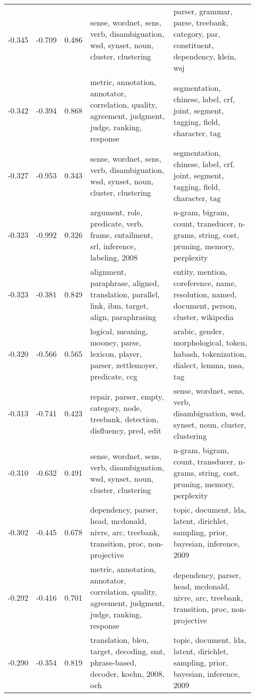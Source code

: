 \begin{tabular}{cccp{5cm}p{5cm}}
-0.345 & -0.709 & 0.486 & sense, wordnet, sens, verb, disambiguation, wsd, synset, noun, cluster, clustering & parser, grammar, parse, treebank, category, par, constituent, dependency, klein, wsj \\
-0.342 & -0.394 & 0.868 & metric, annotation, annotator, correlation, quality, agreement, judgment, judge, ranking, response & segmentation, chinese, label, crf, joint, segment, tagging, field, character, tag \\
-0.327 & -0.953 & 0.343 & sense, wordnet, sens, verb, disambiguation, wsd, synset, noun, cluster, clustering & segmentation, chinese, label, crf, joint, segment, tagging, field, character, tag \\
-0.323 & -0.992 & 0.326 & argument, role, predicate, verb, frame, entailment, srl, inference, labeling, 2008 & n-gram, bigram, count, transducer, n-grams, string, cost, pruning, memory, perplexity \\
-0.323 & -0.381 & 0.849 & alignment, paraphrase, aligned, translation, parallel, link, ibm, target, align, paraphrasing & entity, mention, coreference, name, resolution, named, document, person, cluster, wikipedia \\
-0.320 & -0.566 & 0.565 & logical, meaning, mooney, parse, lexicon, player, parser, zettlemoyer, predicate, ccg & arabic, gender, morphological, token, habash, tokenization, dialect, lemma, msa, tag \\
-0.313 & -0.741 & 0.423 & repair, parser, empty, category, node, treebank, detection, disfluency, pred, edit & sense, wordnet, sens, verb, disambiguation, wsd, synset, noun, cluster, clustering \\
-0.310 & -0.632 & 0.491 & sense, wordnet, sens, verb, disambiguation, wsd, synset, noun, cluster, clustering & n-gram, bigram, count, transducer, n-grams, string, cost, pruning, memory, perplexity \\
-0.302 & -0.445 & 0.678 & dependency, parser, head, mcdonald, nivre, arc, treebank, transition, proc, non-projective & topic, document, lda, latent, dirichlet, sampling, prior, bayesian, inference, 2009 \\
-0.292 & -0.416 & 0.701 & metric, annotation, annotator, correlation, quality, agreement, judgment, judge, ranking, response & dependency, parser, head, mcdonald, nivre, arc, treebank, transition, proc, non-projective \\
-0.290 & -0.354 & 0.819 & translation, bleu, target, decoding, smt, phrase-based, decoder, koehn, 2008, och & topic, document, lda, latent, dirichlet, sampling, prior, bayesian, inference, 2009 \\

\end{tabular}
